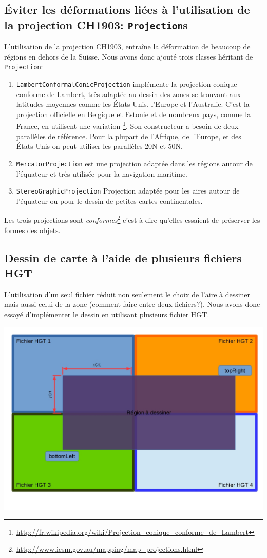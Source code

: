\documentclass[11pt,a4paper]{article}
\begin{document}
\subsection{Éviter les déformations liées à l'utilisation de la projection CH1903: \texttt{Projection}s}
L'utilisation de la projection CH1903, entraîne la déformation de beaucoup de régions en dehors de la Suisse. Nous avons donc ajouté trois classes héritant de \texttt{Projection}:
\begin{enumerate}
    \item \texttt{LambertConformalConicProjection} implémente la projection conique conforme de Lambert, très adaptée au dessin des zones se trouvant aux latitudes moyennes comme les États-Unis, l'Europe et l'Australie. C'est la projection officielle en Belgique et Estonie et de nombreux pays, comme la France, en utilisent une variation \footnote{\url{http://fr.wikipedia.org/wiki/Projection_conique_conforme_de_Lambert}}. Son constructeur a besoin de deux parallèles de référence. Pour la plupart de l'Afrique, de l'Europe, et des États-Unis on peut utiliser les parallèles 20\degre N et 50\degre N. 
    \item \texttt{MercatorProjection} est une projection adaptée dans les régions autour de l'équateur et très utilisée pour la navigation maritime.
    \item \texttt{StereoGraphicProjection} Projection adaptée pour les aires autour de l'équateur ou pour le dessin de petites cartes continentales.
\end{enumerate}
Les trois projections sont \textit{conformes}\footnote{\url{http://www.icsm.gov.au/mapping/map_projections.html}} c'est-à-dire qu'elles essaient de préserver les formes des objets.

\subsection{Dessin de carte à l'aide de plusieurs fichiers HGT}
L'utilisation d'un seul fichier réduit non seulement le choix de l'aire à dessiner mais aussi celui de la zone (comment faire entre deux fichiers?). Nous avons donc essayé d'implémenter le dessin en utilisant plusieurs fichier HGT.

\begin{center}
\includegraphics[scale=0.3]{schema4files.jpg}
\end{center}
\end{document}
